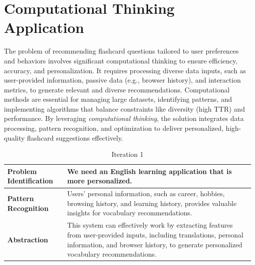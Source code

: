 \documentclass{article}
\begin{document}
\section{Computational Thinking Application}
The problem of recommending flashcard questions tailored to user preferences and behaviors involves significant computational thinking to ensure efficiency, accuracy, and personalization. It requires processing diverse data inputs, such as user-provided information, passive data (e.g., browser history), and interaction metrics, to generate relevant and diverse recommendations. Computational methods are essential for managing large datasets, identifying patterns, and implementing algorithms that balance constraints like diversity (high TTR) and performance. By leveraging \textit{computational thinking}, the solution integrates data processing, pattern recognition, and optimization to deliver personalized, high-quality flashcard suggestions effectively.

\begin{table}[H]
\centering
\begin{tabular}{|p{}|p{}|}
\hline
\textbf{Problem Identification} 
&
We need an English learning application that is more personalized.\\
\hline
\textbf{Pattern Recognition}
&
Users' personal information, such as career, hobbies, browsing history, and learning history, provides valuable insights for vocabulary recommendations.
\\
\hline
\textbf{Abstraction}
&
This system can effectively work by extracting features from user-provided inputs, including translations, personal information, and browser history, to generate personalized vocabulary recommendations.
\\
\hline
\end{tabular}
\caption{Iteration 1}
\label{table:ct-thinking-iter1}
\end{table}
\end{document}

